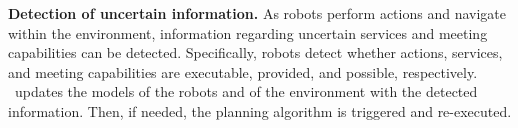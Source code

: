 \textbf{Detection of uncertain information.}
As robots perform actions and navigate within the environment, information regarding uncertain services and meeting capabilities can be detected.
Specifically, robots detect whether actions, services, and meeting capabilities are executable, provided, and possible, respectively.
\toolName\ updates the models of the robots and of the environment with the detected information.
Then, if needed, the planning algorithm is triggered and re-executed.






